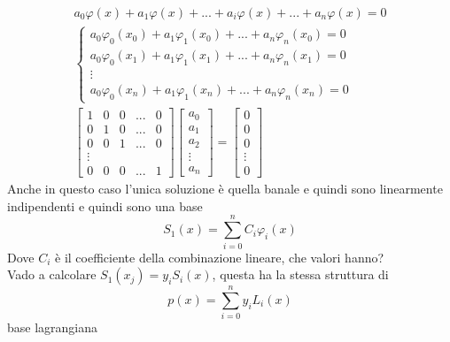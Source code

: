 \documentclass[a4paper, portrait]{book}
\numberwithin{equation}{chapter} %
\begin{document}
\begin{gather}
    a_0\varphi(x)+a_1\varphi(x)+...+a_i\varphi(x)+...+a_n \varphi(x) = 0\\
    \begin{cases}
            a_0\varphi_0(x_0) + a_1\varphi_1(x_0)+...+a_n \varphi_n(x_0) = 0\\
            a_0\varphi_0(x_1) + a_1\varphi_1(x_1)+...+a_n \varphi_n(x_1) = 0\\
            \vdots\\
            a_0\varphi_0(x_n) + a_1\varphi_1(x_n)+...+a_n \varphi_n(x_n) = 0
    \end{cases}\\
    \begin{bmatrix}
        1&0&0&...&0\\
        0&1&0&...&0\\
        0&0&1&...&0\\
        \vdots\\
        0&0&0&...&1
    \end{bmatrix}\begin{bmatrix}
        a_0\\a_1\\a_2\\\vdots\\a_n
    \end{bmatrix} = \begin{bmatrix}
        0\\0\\0\\\vdots \\0
    \end{bmatrix}
\end{gather}
Anche in questo caso l'unica soluzione è quella banale e quindi sono linearmente indipendenti e quindi sono una base
\begin{equation}
    S_1(x) = \sum_{i = 0}^n C_i \varphi_i(x)
\end{equation}
Dove $C_i$ è il coefficiente della combinazione lineare, che valori hanno?\\
Vado a calcolare $S_1(x_j) = y_i S_i(x)$, questa ha la stessa struttura di 
\begin{equation}
    p(x) = \sum_{i=0}^n y_i L_i(x)
\end{equation}
base lagrangiana
\end{document}
